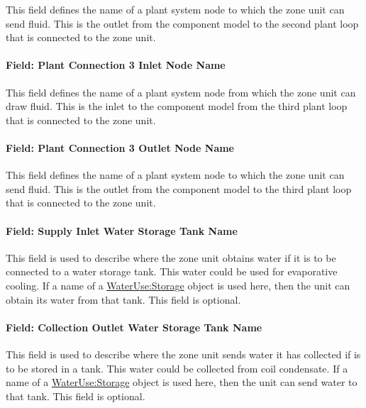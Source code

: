 This field defines the name of a plant system node to which the zone unit can send fluid. This is the outlet from the component model to the second plant loop that is connected to the zone unit.

\paragraph{Field: Plant Connection 3 Inlet Node Name}\label{field-plant-connection-3-inlet-node-name}

This field defines the name of a plant system node from which the zone unit can draw fluid. This is the inlet to the component model from the third plant loop that is connected to the zone unit.

\paragraph{Field: Plant Connection 3 Outlet Node Name}\label{field-plant-connection-3-outlet-node-name}

This field defines the name of a plant system node to which the zone unit can send fluid. This is the outlet from the component model to the third plant loop that is connected to the zone unit.

\paragraph{Field: Supply Inlet Water Storage Tank Name}\label{field-supply-inlet-water-storage-tank-name}

This field is used to describe where the zone unit obtains water if it is to be connected to a water storage tank. This water could be used for evaporative cooling. If a name of a \hyperref[waterusestorage]{WaterUse:Storage} object is used here, then the unit can obtain its water from that tank. This field is optional.

\paragraph{Field: Collection Outlet Water Storage Tank Name}\label{field-collection-outlet-water-storage-tank-name}

This field is used to describe where the zone unit sends water it has collected if is to be stored in a tank. This water could be collected from coil condensate. If a name of a \hyperref[waterusestorage]{WaterUse:Storage} object is used here, then the unit can send water to that tank. This field is optional.

